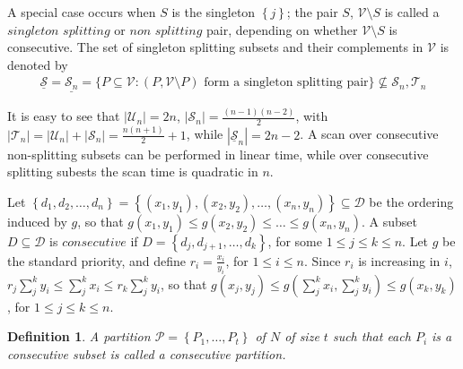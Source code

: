\documentclass{article}
\newtheorem{definition}{Definition}
\theoremstyle{case}
\begin{document}
A special case occurs when $S$ is the singleton $\left\lbrace j\right\rbrace$; the pair $S$, $\mathcal{V}\setminus S$ is called a $\textit{singleton splitting}$ or $\textit{non splitting}$ pair, depending on whether $\mathcal{V}\setminus S$ is consecutive. The set of singleton splitting subsets and their complements in $\mathcal{V}$ is denoted by 
\begin{align*}
\mathcal{\underline{S}} = \underline{\mathcal{S}_n}  = \{ P \subseteq \mathcal{V} \colon (P, \mathcal{V} \setminus P) \textrm{ form a singleton splitting pair}\} \not \subseteq \mathcal{S}_n, \mathcal{T}_n
\end{align*}


It is easy to see that $| \mathcal{U}_n | = 2n$, $| \mathcal{S}_n | = \frac{(n-1)(n-2)}{2}$, with $| \mathcal{T}_n | = | \mathcal{U}_n | + | \mathcal{S}_n | = \frac{n(n+1)}{2} + 1$, while $| \underline{\mathcal{S}}_n | = 2n - 2$. A scan over consecutive non-splitting subsets can be performed in linear time, while over consecutive splitting subests the scan time is quadratic in $n$.

Let $\left\lbrace d_1, d_2, \dots, d_n\right\rbrace = \left\lbrace (x_1,y_1), (x_2,y_2), \dots, (x_n,y_n)\right\rbrace \subseteq \mathcal{D}$ be the ordering induced by $g$, so that $g(x_1,y_1) \leq g(x_2,y_2) \leq \dots \leq g(x_n,y_n)$. A subset $D \subseteq \mathcal{D}$ is $\textit{consecutive}$ if $D = \left\lbrace d_j, d_{j+1}, \dots, d_k\right\rbrace$, for some $1 \leq j \leq k \leq n$. Let $g$ be the standard priority, and define $r_i = \frac{x_i}{y_i}$, for $1 \leq i \leq n$. Since $r_i$ is increasing in $i$, $r_j\sum_j^k y_i \leq \sum_j^k x_i \leq r_k\sum_j^k y_i$, so that $g(x_j,y_j) \leq g(\sum_j^k x_i, \sum_j^k y_i) \leq g(x_k,y_k)$, for $1 \leq j \leq k \leq n$. 


\begin{definition}
A partition $\mathcal{P} = \left\lbrace P_1, \dots, P_t\right\rbrace$ of $N$ of size $t$ such that each $P_i$ is a consecutive subset is called a consecutive partition. 
\end{definition}
\end{document}
